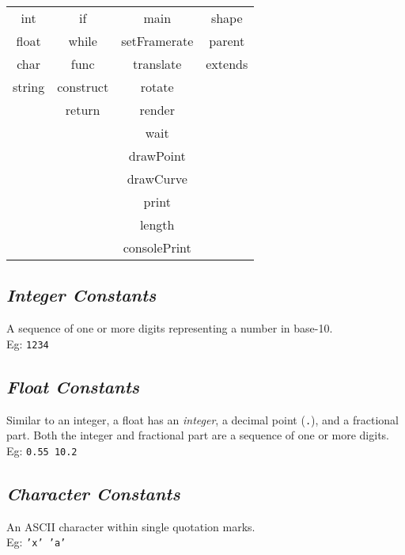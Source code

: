 \documentclass[letterpaper,12pt]{article}
\begin{document}
        \begin{center}
            \begin{tabular}{ |c|c|c|c| } 
            \hline
                int     & if            & main          & shape \\ 
                float   & while         & setFramerate  & parent\\ 
                char    & func          & translate     & extends\\
                string  & construct     & rotate        & \\
                        & return        & render        & \\
                        &               & wait          & \\
                        &               & drawPoint     & \\
                        &               & drawCurve     & \\
                        &               & print         & \\
                        &               & length        & \\
                        &               & consolePrint  & \\
            \hline
            \end{tabular}
        \end{center}

    \subsection{\textit{Integer Constants}}
    A sequence of one or more digits representing a number in base-10.\\
    Eg: \texttt{1234}

    \subsection{\textit{Float Constants}}
    Similar to an integer, a float has an \textit{integer}, a decimal point (\texttt{.}), and a fractional part. Both the integer and fractional part are a sequence of one or more digits.\\
    Eg: \texttt{0.55  10.2}

    \subsection{\textit{Character Constants}}
    An ASCII character within single quotation marks.\\
    Eg: \texttt{'x' 'a'}
\end{document}
